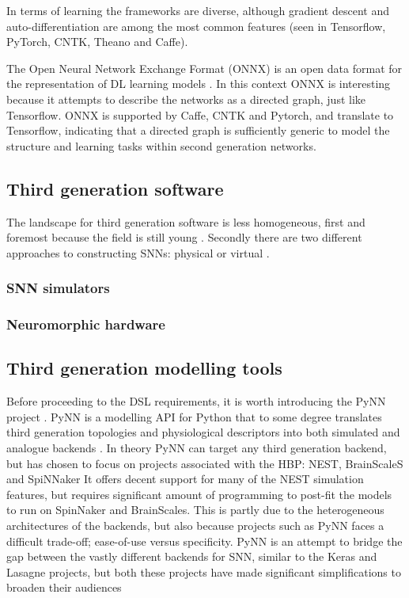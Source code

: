 \documentclass[report.tex]{subfiles}
\begin{document}
In terms of learning the frameworks are diverse, although gradient descent 
and auto-differentiation are among the most common features 
(seen in Tensorflow, PyTorch, CNTK, Theano
and Caffe). 

The Open Neural Network Exchange Format (ONNX) is an open data format for the representation
of \gls{DL} learning models \cite{ONNX2018}. 
In this context ONNX is interesting because it attempts to describe the networks as 
a directed graph, just like Tensorflow.
ONNX is supported by Caffe, CNTK and Pytorch, and translate to Tensorflow,
indicating that a directed graph is 
sufficiently generic to model the structure and learning tasks within 
second generation networks.


\subsection{Third generation software}
The landscape for third generation software is less homogeneous, first and
foremost because the field is still young \cite{Maass1991}.
Secondly there are two different approaches to constructing \gls{SNN}s:
physical or virtual \cite{Maass1997, Davison2009, Albada2018}. %

\subsubsection{\Gls{SNN} simulators}
\subsubsection{Neuromorphic hardware}

\subsection{Third generation modelling tools}
Before proceeding to the DSL requirements, it is worth introducing
the PyNN  project \cite{Davison2009}. 
PyNN is a modelling \gls{API} for \gls{Python} that to some degree translates
third generation topologies and physiological descriptors into both simulated
and analogue backends \cite{Davison2009}.
In theory PyNN can target any third generation backend, but has chosen to focus
on projects associated with the \gls{HBP}: NEST, BrainScaleS and SpiNNaker
\cite{Davison2009} %
It offers decent support for many of the NEST simulation features, but
requires significant amount of programming to post-fit the models to 
run on SpinNaker and BrainScales. %
This is partly due to the heterogeneous architectures of the backends, but
also because projects such as PyNN faces a difficult trade-off; ease-of-use
versus specificity. %
PyNN is an attempt to bridge the gap between the vastly different backends
for \gls{SNN}, similar to the Keras and Lasagne projects, but both these
projects have made significant simplifications to broaden their audiences
\end{document}
